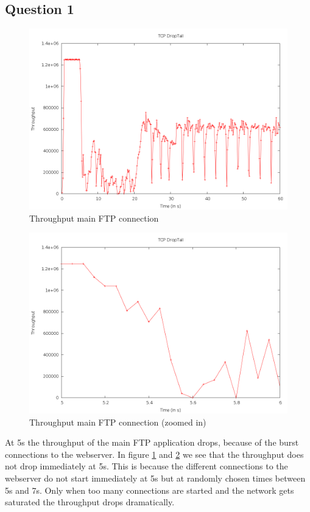 \documentclass[11pt,a4paper]{article}
\begin{document}
\subsection{Question 1}
\begin{figure}[h!]
 \centering
 \includegraphics[width = 0.9\linewidth]{./ex2-part1-tp.png}
 \caption{Throughput main FTP connection}
 \label{fig:Q21}
\end{figure}
\begin{figure}[h!]
 \centering
 \includegraphics[width = 0.9\linewidth]{./ex2-part1-zoom.png}
 \caption{Throughput main FTP connection (zoomed in)}
 \label{fig:Q211}
\end{figure}

At 5s the throughput of the main FTP application drops, because of the burst connections to the 
webserver. In figure \ref{fig:Q21} and \ref{fig:Q211} we see that the throughput does not drop
immediately at 5s. This is because the different connections to the webserver do not start
immediately at 5s but at randomly chosen times between 5s and 7s. Only when too many connections are started and the network gets saturated the throughput drops dramatically.
\end{document}
